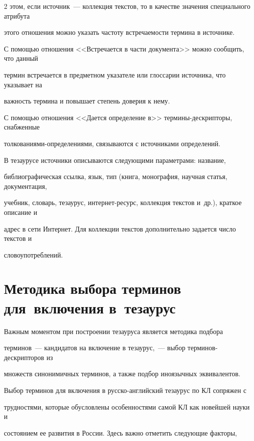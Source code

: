 \begin{multicols}{2}
этом, если источник~--- коллекция текстов, то в качестве значения специального атрибута 

этого отношения можно указать частоту встречаемости термина в источнике.

  

  С помощью отношения <<Встречается в части документа>> можно сообщить, что данный 

термин встречается в предметном указателе или глоссарии источника, что указывает на 

важность термина и повышает степень доверия к нему. 

  

  С помощью отношения <<Дается определение в>> термины-дескрипторы, снабженные 

толкованиями-определениями, связываются с источниками определений.

  

  В тезаурусе источники описываются сле\-ду\-ющи\-ми параметрами: название, 

библиографическая ссылка, язык, тип (книга, монография, научная статья, документация, 

учебник, словарь, тезаурус, интернет-ресурс, коллекция текстов и~др.), краткое описание и 

адрес в сети Интернет. Для коллекции текстов дополнительно задается число текстов и 

словоупотреблений.



\section{Методика выбора терминов для~включения в~тезаурус}



  Важным моментом при построении тезауруса является методика подбора 

  терминов~--- кандидатов на включение в тезаурус,~--- выбор терминов-дескрипторов из 

множеств синонимичных терминов, а также подбор иноязычных эквивалентов. 

  

  Выбор терминов для включения в русско-анг\-лий\-ский тезаурус по КЛ сопряжен с 

трудностями, которые обусловлены особенностями самой КЛ как новейшей науки и 

состоянием ее развития в России. Здесь важно отметить следующие факторы, 


\end{multicols}

